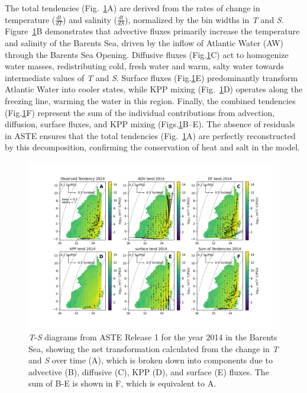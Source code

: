 \documentclass[draft]{agujournal2019}
\begin{document}
The total tendencies (Fig.~\ref{fig:sample_wmt}A) are derived from the rates of change in temperature ($\frac{dt}{dT}$) and salinity ($\frac{dt}{dS}$), normalized by the bin widths in \emph{T} and \emph{S}. Figure~\ref{fig:sample_wmt}B demonstrates that advective fluxes primarily increase the temperature and salinity of the Barents Sea, driven by the inflow of Atlantic Water (AW) through the Barents Sea Opening. Diffusive fluxes (Fig.\ref{fig:sample_wmt}C) act to homogenize water masses, redistributing cold, fresh water and warm, salty water towards intermediate values of \emph{T} and \emph{S}. Surface fluxes (Fig.\ref{fig:sample_wmt}E) predominantly transform Atlantic Water into cooler states, while KPP mixing (Fig.~\ref{fig:sample_wmt}D) operates along the freezing line, warming the water in this region. Finally, the combined tendencies (Fig.\ref{fig:sample_wmt}F) represent the sum of the individual contributions from advection, diffusion, surface fluxes, and KPP mixing (Figs.\ref{fig:sample_wmt}B--E). The absence of residuals in ASTE ensures that the total tendencies (Fig.~\ref{fig:sample_wmt}A) are perfectly reconstructed by this decomposition, confirming the conservation of heat and salt in the model.


    \begin{figure}
    \includegraphics[width=\linewidth]{figs/BarentsS_alltend_2014.png}
    \vspace{-5pt} %
    \caption{\emph{T}-\emph{S} diagrams from ASTE Release 1 for the year 2014 in the Barents Sea, showing the net transformation calculated from the change in \emph{T} and \emph{S} over time (A), which is broken down into components due to advective (B), diffusive (C), KPP (D), and surface (E) fluxes. The sum of B-E is shown in F, which is equivalent to A.}
    \label{fig:sample_wmt}
    \vspace{-20pt}
    \end{figure}
\end{document}
